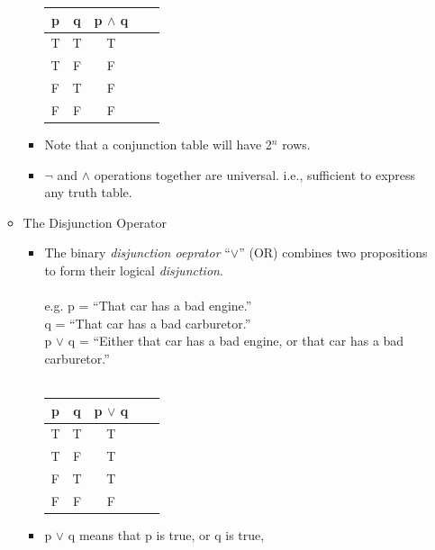 \documentclass[english, 11pt]{article}
\begin{document}
\begin{addmargin}[2em]{2em}
\begin{addmargin}[1em]{2em}
\begin{itemize}
\begin{itemize}
\begin{itemize}
                    \begin{tabular}{cc|ccc}
                      p & q & p  $\wedge$  q \\
                      \hline
                      T & T & T  \\
                      T & F & F  \\
                      F & T & F  \\
                      F & F & F
                    \end{tabular}
                    \item Note that a conjunction table will have 2$^n$ rows.
                    \item $\neg$ and $\wedge$ operations together are universal.
                    i.e., sufficient to express any truth table.
                  \end{itemize}
                  \item The Disjunction Operator
                    \begin{itemize}
                      \item The binary \textit{disjunction oeprator} ``$\vee$'' (OR)
                      combines two propositions to form their logical \textit{disjunction}.
                       \\
                       \\
                      e.g. p = ``That car has a bad engine.''
                        \\
                        q = ``That car has a bad carburetor.''
                        \\
                        p $\vee$ q = ``Either that car has a bad engine, or
                        that car has a bad carburetor.''
                        \\
                        \\
                        \begin{tabular}{cc|ccc}
                          p & q & p  $\vee$  q \\
                          \hline
                          T & T & T  \\
                          T & F & T  \\
                          F & T & T  \\
                          F & F & F
                        \end{tabular}
                        \item p $\vee$ q means that p is true, or q is true,

\end{itemize}
\end{itemize}
\end{itemize}
\end{addmargin}
\end{addmargin}
\end{document}
